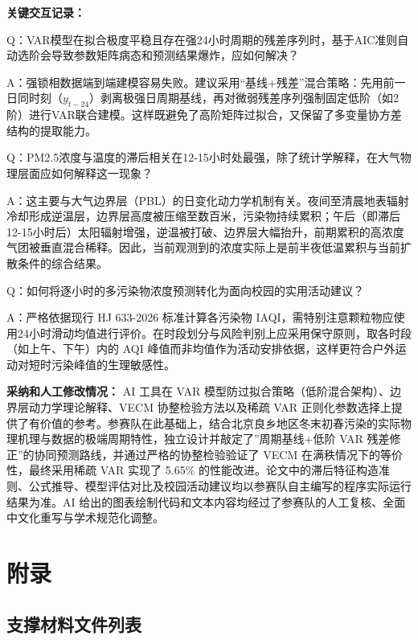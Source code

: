 \documentclass[UTF8,a4paper,12pt]{ctexart}
\begin{document}
\noindent\textbf{关键交互记录：}

Q：VAR模型在拟合极度平稳且存在强24小时周期的残差序列时，基于AIC准则自动选阶会导致参数矩阵病态和预测结果爆炸，应如何解决？

A：强锁相数据端到端建模容易失败。建议采用“基线+残差”混合策略：先用前一日同时刻（$y_{t-24}$）剥离极强日周期基线，再对微弱残差序列强制固定低阶（如2阶）进行VAR联合建模。这样既避免了高阶矩阵过拟合，又保留了多变量协方差结构的提取能力。

\vspace{0.8em}
Q：PM2.5浓度与温度的滞后相关在12-15小时处最强，除了统计学解释，在大气物理层面应如何解释这一现象？

A：这主要与大气边界层（PBL）的日变化动力学机制有关。夜间至清晨地表辐射冷却形成逆温层，边界层高度被压缩至数百米，污染物持续累积；午后（即滞后12-15小时后）太阳辐射增强，逆温被打破、边界层大幅抬升，前期累积的高浓度气团被垂直混合稀释。因此，当前观测到的浓度实际上是前半夜低温累积与当前扩散条件的综合结果。

\vspace{0.8em}
Q：如何将逐小时的多污染物浓度预测转化为面向校园的实用活动建议？

A：严格依据现行 HJ 633-2026 标准计算各污染物 IAQI，需特别注意颗粒物应使用24小时滑动均值进行评价。在时段划分与风险判别上应采用保守原则，取各时段（如上午、下午）内的 AQI 峰值而非均值作为活动安排依据，这样更符合户外运动对短时污染峰值的生理敏感性。

\vspace{1.0em}
\noindent\textbf{采纳和人工修改情况：}
AI 工具在 VAR 模型防过拟合策略（低阶混合架构）、边界层动力学理论解释、VECM 协整检验方法以及稀疏 VAR 正则化参数选择上提供了有价值的参考。参赛队在此基础上，结合北京良乡地区冬末初春污染的实际物理机理与数据的极端周期特性，独立设计并敲定了”周期基线+低阶 VAR 残差修正”的协同预测路线，并通过严格的协整检验验证了 VECM 在满秩情况下的等价性，最终采用稀疏 VAR 实现了 5.65\% 的性能改进。论文中的滞后特征构造准则、公式推导、模型评估对比及校园活动建议均以参赛队自主编写的程序实际运行结果为准。AI 给出的图表绘制代码和文本内容均经过了参赛队的人工复核、全面中文化重写与学术规范化调整。

\section{附录}

\subsection{支撑材料文件列表}
\end{document}
